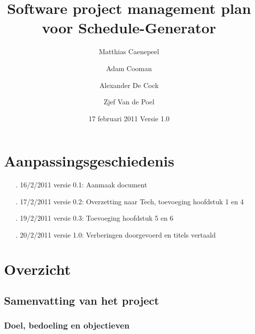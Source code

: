\documentclass{article}
\title{Software project management plan voor Schedule-Generator}
\author{Matthias Caenepeel \and Adam Cooman \and Alexander De Cock \and Zjef Van de Poel}
\date{17 februari 2011 Versie 1.0}
\begin{document}
\maketitle

\newpage


\newpage


\newpage

\section*{Aanpassingsgeschiedenis}
\begin{itemize}
\item[.] 16/2/2011 versie 0.1: Aanmaak document \\[-3mm]
\item[.] 17/2/2011 versie 0.2: Overzetting naar Tech, toevoeging hoofdstuk 1 en 4\\[-3mm]
\item[.] 19/2/2011 versie 0.3: Toevoeging hoofdstuk 5 en 6\\[-3mm]
\item[.] 20/2/2011 versie 1.0: Verberingen doorgevoerd en titels vertaald\\[-3mm]
\end{itemize}


\newpage
\tableofcontents

\newpage
\section{Overzicht}


\subsection{Samenvatting van het project}

\subsubsection{Doel, bedoeling en objectieven}
\end{document}
